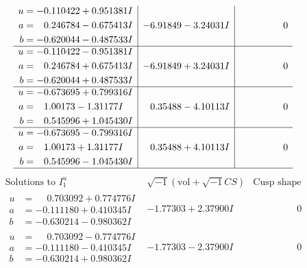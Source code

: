 \documentclass[1p]{elsarticle_modified}
\theoremstyle{definition}
\newcommand{\I}{\sqrt{-1}}
\begin{document}
$$\begin{array}{c|c|c}
\begin{aligned}
u &= -0.110422 + 0.951381 I \\
a &= \phantom{-}0.246784 - 0.675413 I \\
b &= -0.620044 - 0.487533 I\end{aligned}
 & -6.91849 - 3.24031 I & \phantom{-0.000000 } 0 \\ \hline\begin{aligned}
u &= -0.110422 - 0.951381 I \\
a &= \phantom{-}0.246784 + 0.675413 I \\
b &= -0.620044 + 0.487533 I\end{aligned}
 & -6.91849 + 3.24031 I & \phantom{-0.000000 } 0 \\ \hline\begin{aligned}
u &= -0.673695 + 0.799316 I \\
a &= \phantom{-}1.00173 - 1.31177 I \\
b &= \phantom{-}0.545996 + 1.045430 I\end{aligned}
 & \phantom{-}0.35488 - 4.10113 I & \phantom{-0.000000 } 0 \\ \hline\begin{aligned}
u &= -0.673695 - 0.799316 I \\
a &= \phantom{-}1.00173 + 1.31177 I \\
b &= \phantom{-}0.545996 - 1.045430 I\end{aligned}
 & \phantom{-}0.35488 + 4.10113 I & \phantom{-0.000000 } 0\\
 \hline 
 \end{array}$$\newpage$$\begin{array}{c|c|c}  
\text{Solutions to }I^u_{1}& \I (\text{vol} + \sqrt{-1}CS) & \text{Cusp shape}\\
 \hline 
\begin{aligned}
u &= \phantom{-}0.703092 + 0.774776 I \\
a &= -0.111180 + 0.410345 I \\
b &= -0.630214 - 0.980362 I\end{aligned}
 & -1.77303 + 2.37900 I & \phantom{-0.000000 } 0 \\ \hline\begin{aligned}
u &= \phantom{-}0.703092 - 0.774776 I \\
a &= -0.111180 - 0.410345 I \\
b &= -0.630214 + 0.980362 I\end{aligned}
 & -1.77303 - 2.37900 I & \phantom{-0.000000 } 0 \\ \hline\begin{aligned}

\end{aligned}
\end{array}$$
\end{document}
